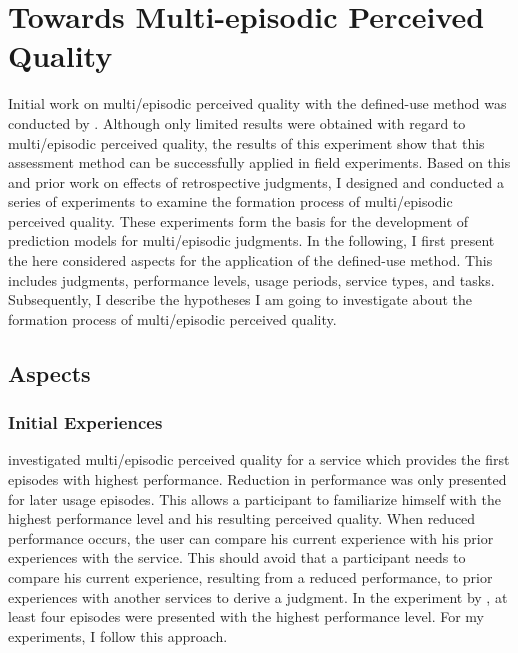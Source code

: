 \chapter{Towards Multi-episodic Perceived Quality}\label{chap:towards}
Initial work on multi\-/episodic perceived quality with the  defined-use method was conducted by \citet{moller_single-call_2011}.
Although only limited results were obtained with regard to multi\-/episodic perceived quality, the results of this experiment show that this assessment method can be successfully applied in field experiments.
Based on this and prior work on effects of retrospective judgments, I designed and conducted a series of experiments to examine the formation process of multi\-/episodic perceived quality. 
These experiments form the basis for the development of prediction models for multi\-/episodic judgments.
In the following, I first present the here considered aspects for the application of the defined-use method.
This includes judgments, performance levels, usage periods, service types, and tasks.
Subsequently, I describe the hypotheses I am going to investigate about the formation process of multi\-/episodic perceived quality.

\section{Aspects}

\subsection{Initial Experiences}
\citet{moller_single-call_2011} investigated multi\-/episodic perceived quality for a service which provides the first episodes with highest performance.
Reduction in performance was only presented for later usage episodes.
This allows a participant to familiarize himself with the highest performance level and his resulting perceived quality.
When reduced performance occurs, the user can compare his current experience with his prior experiences with the service.
This should avoid that a participant needs to compare his current experience, resulting from a reduced performance, to prior experiences with another services to derive a judgment.
In the experiment by \citet{moller_single-call_2011}, at least four episodes were presented with the highest performance level.
For my experiments, I follow this approach.

